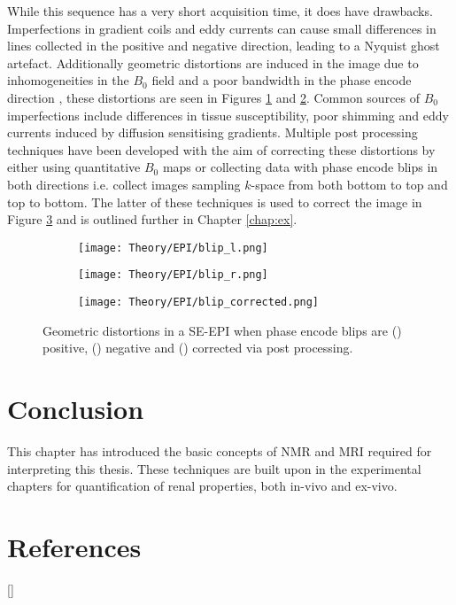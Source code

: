 While this sequence has a very short acquisition time, it does have drawbacks. Imperfections in gradient coils and eddy currents can cause small differences in lines collected in the positive and negative direction, leading to a Nyquist ghost artefact. Additionally geometric distortions are induced in the image due to inhomogeneities in the $B_0$ field and a poor bandwidth in the phase encode direction \cite{andersson_how_2003}, these distortions are seen in Figures \ref{fig:theory_epi_blip_l} and \ref{fig:theory_epi_blip_r}. Common sources of $B_0$ imperfections include differences in tissue susceptibility, poor shimming and eddy currents induced by diffusion sensitising gradients. Multiple post processing techniques have been developed with the aim of correcting these distortions by either using quantitative $B_0$ maps or collecting data with phase encode blips in both directions i.e. collect images sampling $k$-space from both bottom to top and top to bottom. The latter of these techniques is used to correct the image in Figure \ref{fig:theory_epi_blip_corrected} and is outlined further in Chapter \ref{chap:ex}.

\begin{figure}[H]
	\centering
	\begin{subfigure}[c]{0.30\textwidth}
		\centering
		\texttt{[image: Theory/EPI/blip\_l.png]}
		\caption{}
		\label{fig:theory_epi_blip_l}
	\end{subfigure}
	\hfill
	\begin{subfigure}[c]{0.30\textwidth}
		\centering
		\texttt{[image: Theory/EPI/blip\_r.png]}
		\caption{}
		\label{fig:theory_epi_blip_r}
	\end{subfigure}
	\hfill	
	\begin{subfigure}[c]{0.30\textwidth}
		\centering
		\texttt{[image: Theory/EPI/blip\_corrected.png]}
		\caption{}
		\label{fig:theory_epi_blip_corrected}
	\end{subfigure}
	\caption{Geometric distortions in a \ac{SE}-\ac{EPI} when phase encode blips are () positive, () negative and () corrected via post processing.}
	\label{fig:theory_epi_eddy}
\end{figure}

\section{Conclusion}
This chapter has introduced the basic concepts of \ac{NMR} and \ac{MRI} required for interpreting this thesis. These techniques are built upon in the experimental chapters for quantification of renal properties, both in-vivo and ex-vivo.

\newpage
\section{References}
[\refname]{}
\printbibliography